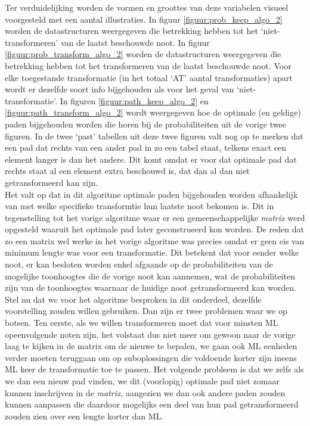 Ter verduidelijking worden de vormen en groottes van deze variabelen visueel voorgesteld met een aantal illustraties. In figuur \ref{figuur:prob_keep_algo_2} worden de datastructuren weergegeven die betrekking hebben tot het `niet-transformeren' van de laatst beschouwde noot. In figuur \ref{figuur:prob_transform_algo_2} worden de datastructuren weergegeven die betrekking hebben tot het transformeren van de laatst beschouwde noot. Voor elke toegestande transformatie (in het totaal `AT' aantal transformaties) apart wordt er dezelfde soort info bijgehouden als voor het geval van `niet-transformatie'. In figuren \ref{figuur:path_keep_algo_2} en \ref{figuur:path_transform_algo_2} wordt weergegeven hoe de optimale (en geldige) paden bijgehouden worden die horen bij de probabiliteiten uit de vorige twee figuren. In de twee `past' tabellen uit deze twee figuren valt nog op te merken dat een pad dat rechts van een ander pad in zo een tabel staat, telkens exact een element langer is dan het andere. Dit komt omdat er voor dat optimale pad dat rechts staat al een element extra beschouwd is, dat dan al dan niet getransformeerd kan zijn.\\

Het valt op dat in dit algoritme optimale paden bijgehouden worden afhankelijk van met welke specifieke transformtie hun laatste noot bekomen is. Dit in tegenstelling tot het vorige algoritme waar er een gemeenschappelijke \textit{matrix} werd opgesteld waaruit het optimale pad later geconstrueerd kon worden. De reden dat zo een matrix wel werke in het vorige algoritme was precies omdat er geen eis van minimum lengte was voor een transformatie. Dit betekent dat voor eender welke noot, er kan besloten worden enkel afgaande op de probabiliteiten van de mogelijke toonhoogtes die de vorige noot kan aannemen, wat de probabiliteiten zijn van de toonhoogtes waarnaar de huidige noot getransformeerd kan worden. Stel nu dat we voor het algoritme besproken in dit onderdeel, dezelfde voorstelling zouden willen gebruiken. Dan zijn er twee problemen waar we op botsen. Ten eerste, als we willen transformeren moet dat voor minsten ML opeenvolgende noten zijn, het volstaat dus niet meer om gewoon naar de vorige laag te kijken in de matrix om de nieuwe te bepalen, we gaan ook ML eenheden verder moeten teruggaan om op suboplossingen die voldoende korter zijn ineens ML keer de transformatie toe te passen. Het volgende probleem is dat we zelfs als we dan een nieuw pad vinden, we dit (voorlopig) optimale pad niet zomaar kunnen inschrijven in de \textit{matrix}, aangezien we dan ook andere paden zouden kunnen aanpassen die daardoor mogelijks een deel van hun pad getransformeerd zouden zien over een lengte korter dan ML. 

